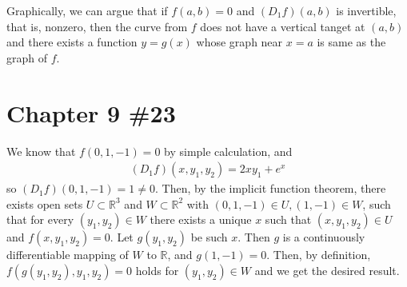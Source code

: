 \documentclass{scrartcl}
\begin{document}
Graphically, we can argue that if \(f(a, b) = 0\) and \((D_1 f) (a, b)\) is
invertible, that is, nonzero, then the curve from \(f\) does not have a
vertical tanget at \((a, b)\) and there exists a function \(y = g(x)\) whose
graph near \(x = a\) is same as the graph of \(f\).

\section{Chapter 9 \#23}
We know that \(f(0, 1, -1) = 0\) by simple calculation, and
\begin{align*}
  (D_1 f) (x, y_1, y_2) = 2xy_1 + e^x
\end{align*}
so \((D_1 f) (0, 1, -1) = 1 \not = 0\). Then, by the implicit function theorem,
there exists open sets \(U \subset \mathbb{R}^3\) and \(W \subset \mathbb{R}^2\)
with \((0, 1, -1) \in U, (1, -1) \in W\), such that for every \((y_1, y_2) \in
W\) there exists a unique \(x\) such that \((x, y_1, y_2) \in U\) and \(f(x,
y_1, y_2) = 0\). Let \(g(y_1, y_2)\) be such \(x\). Then \(g\) is a
continuously differentiable mapping of \(W\) to \(\mathbb{R}\), and \(g(1, -1)
= 0\). Then, by definition, \(f(g(y_1, y_2), y_1, y_2) = 0\) holds for \((y_1,
y_2) \in W\) and we get the desired result.
\end{document}
